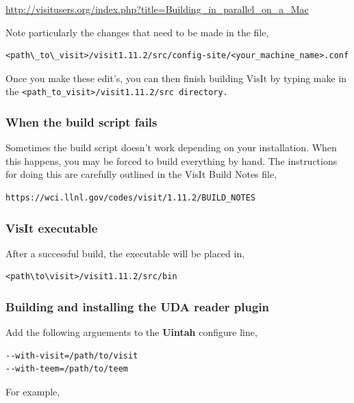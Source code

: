 \documentclass[12pt]{article}
\begin{document}
\url{http://visitusers.org/index.php?title=Building_in_parallel_on_a_Mac}

  
Note particularly the changes that need to be made in the file, 

\begin{verbatim}
<path\_to\_visit>/visit1.11.2/src/config-site/<your_machine_name>.conf
\end{verbatim}

\normalfont Once you make these edit's, you can then finish building VisIt by typing make in the \tt <path\_to\_visit>/visit1.11.2/src \normalfont directory.  

\subsubsection{When the build script fails}
\label{sec:WhenTheBuildsSriptFails}

Sometimes the build script doesn't work depending on your
installation. When this happens, you may be forced to build everything
by hand. The instructions for doing this are carefully outlined in the
VisIt Build Notes file,

\begin{verbatim}
https://wci.llnl.gov/codes/visit/1.11.2/BUILD_NOTES
\end{verbatim}

\subsubsection{VisIt executable}
\label{sec:VisItExecutable}

After a successful build, the executable will be placed in,

\begin{verbatim}
<path\to\visit>/visit1.11.2/src/bin
\end{verbatim}

\subsubsection{Building and installing the UDA reader plugin}
\label{sec:BuildingAndInstallingUDAPlugin}

Add the following arguements to the \textbf{Uintah} configure line,

\begin{verbatim}
--with-visit=/path/to/visit 
--with-teem=/path/to/teem
\end{verbatim}

For example,
\end{document}
